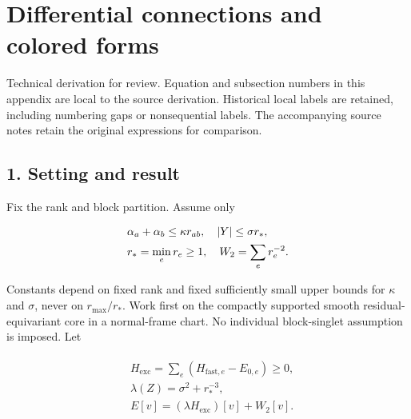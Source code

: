\clearpage
\section{Differential connections and colored
forms}\label{g-differential-connections-and-colored-forms}

Technical derivation for review. Equation and subsection numbers in this
appendix are local to the source derivation. Historical local labels are
retained, including numbering gaps or nonsequential labels. The
accompanying source notes retain the original expressions for
comparison.

\subsection{1. Setting and result}\label{g-setting-and-result}

Fix the rank and block partition. Assume only

\begin{gather*}
\begin{aligned}
& \alpha _{a}+\alpha _{b} \le  \kappa  r_{ab}, \quad  \vert Y\vert  \le  \sigma  r_{*}, \\
& r_{*} = \min _{e} r_{e} \ge  1, \quad  W_{2} = \sum _{e} r_{e}^{-2}.
\end{aligned}\notag
\end{gather*}

Constants depend on fixed rank and fixed sufficiently small upper bounds
for \(\kappa\) and \(\sigma\), never on \(r_{\max}/r_{*}\). Work first
on the compactly supported smooth residual-equivariant core in a
normal-frame chart. No individual block-singlet assumption is imposed.
Let

\begin{gather*}
\begin{aligned}
& H_{\mathrm{exc}} = \sum _{e} (H_{\mathrm{fast},e}-E_{0,e}) \ge  0, \\
& \lambda (Z) = \sigma ^{2}+r_{*}^{-3}, \\
& E[v] = (\lambda  H_{\mathrm{exc}})[v]+W_{2}[v].
\end{aligned}\tag{1.1}
\end{gather*}

